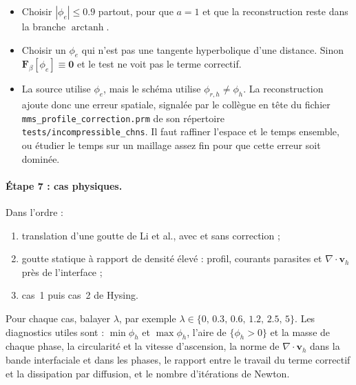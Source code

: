 \begin{itemize}
  \item Choisir $|\phi_e|\le0.9$ partout, pour que $a=1$ et que la reconstruction reste dans la branche $\operatorname{arctanh}$.
  \item Choisir un $\phi_e$ qui n'est pas une tangente hyperbolique d'une distance. Sinon $\mathbf{F}_\beta[\phi_e]\equiv\mathbf{0}$ et le test ne voit pas le terme correctif.
  \item La source utilise $\phi_e$, mais le schéma utilise $\phi_{r,h}\neq\phi_h$. La reconstruction ajoute donc une erreur spatiale, signalée par le collègue en tête du fichier \texttt{mms\_profile\_correction.prm} de son répertoire \texttt{tests/incompressible\_chns}. Il faut raffiner l'espace et le temps ensemble, ou étudier le temps sur un maillage assez fin pour que cette erreur soit dominée.
\end{itemize}

\paragraph{Étape 7 : cas physiques.} Dans l'ordre :
\begin{enumerate}
  \item translation d'une goutte de Li et al., avec et sans correction ;
  \item goutte statique à rapport de densité élevé : profil, courants parasites et $\nabla\cdot\mathbf{v}_h$ près de l'interface ;
  \item cas~1 puis cas~2 de Hysing.
\end{enumerate}
Pour chaque cas, balayer $\lambda$, par exemple $\lambda\in\{0,\,0.3,\,0.6,\,1.2,\,2.5,\,5\}$. Les diagnostics utiles sont : $\min\phi_h$ et $\max\phi_h$, l'aire de $\{\phi_h>0\}$ et la masse de chaque phase, la circularité et la vitesse d'ascension, la norme de $\nabla\cdot\mathbf{v}_h$ dans la bande interfaciale et dans les phases, le rapport entre le travail du terme correctif et la dissipation par diffusion, et le nombre d'itérations de Newton.

